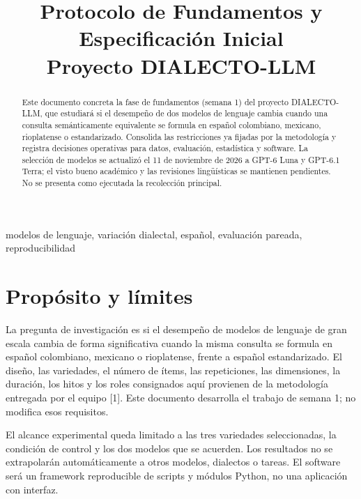 \documentclass[conference]{IEEEtran}
\title{Protocolo de Fundamentos y Especificación Inicial\\Proyecto DIALECTO-LLM}
\author{\IEEEauthorblockN{Grupo 3}\IEEEauthorblockA{Documento de trabajo\\Noviembre de 2026}}
\begin{document}
\maketitle
\begin{abstract}
Este documento concreta la fase de fundamentos (semana 1) del proyecto DIALECTO-LLM, que estudiará si el desempeño de dos modelos de lenguaje cambia cuando una consulta semánticamente equivalente se formula en español colombiano, mexicano, rioplatense o estandarizado. Consolida las restricciones ya fijadas por la metodología y registra decisiones operativas para datos, evaluación, estadística y software. La selección de modelos se actualizó el 11 de noviembre de 2026 a GPT-6 Luna y GPT-6.1 Terra; el visto bueno académico y las revisiones lingüísticas se mantienen pendientes. No se presenta como ejecutada la recolección principal.
\end{abstract}
\begin{IEEEkeywords}
modelos de lenguaje, variación dialectal, español, evaluación pareada, reproducibilidad
\end{IEEEkeywords}

\section{Propósito y límites}
La pregunta de investigación es si el desempeño de modelos de lenguaje de gran escala cambia de forma significativa cuando la misma consulta se formula en español colombiano, mexicano o rioplatense, frente a español estandarizado. El diseño, las variedades, el número de ítems, las repeticiones, las dimensiones, la duración, los hitos y los roles consignados aquí provienen de la metodología entregada por el equipo [1]. Este documento desarrolla el trabajo de semana 1; no modifica esos requisitos.

El alcance experimental queda limitado a las tres variedades seleccionadas, la condición de control y los dos modelos que se acuerden. Los resultados no se extrapolarán automáticamente a otros modelos, dialectos o tareas. El software será un framework reproducible de scripts y módulos Python, no una aplicación con interfaz.
\end{document}
